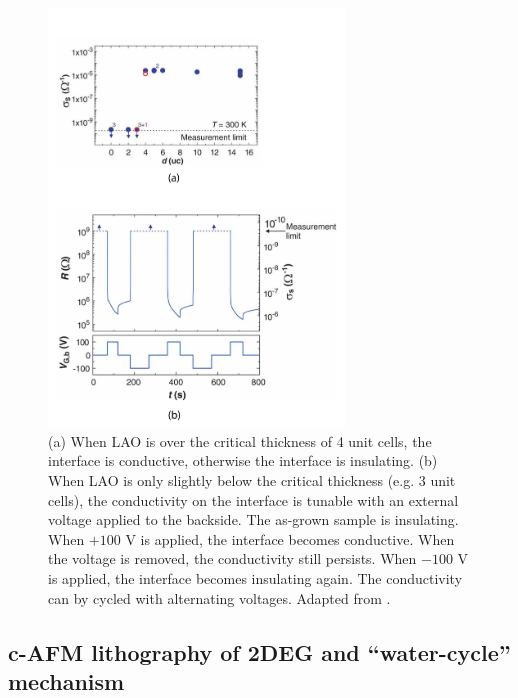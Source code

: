 \documentclass[pdflatex, sectionletters, 12pt]{pittetd}    %
\begin{document}
\begin{figure}[p]
	\centering
	\includegraphics[width=0.7\textwidth]{Drawing/CriticalThickness.pdf}
	\caption{(a) When LAO is over the critical thickness of 4 unit cells, the interface is conductive, otherwise the interface is insulating. (b) When LAO is only slightly below the critical thickness (e.g. 3 unit cells), the conductivity on the interface is tunable with an external voltage applied to the backside. The as-grown sample is insulating. When $+100$ V is applied, the interface becomes conductive. When the voltage is removed, the conductivity still persists. When $-100$ V is applied, the interface becomes insulating again. The conductivity can by cycled with alternating voltages. Adapted from \cite{thiel2006tunable}.}
	\label{FIG:CriticalThickness}
\end{figure}

\subsection{c-AFM lithography of 2DEG and ``water-cycle'' mechanism}
\end{document}
